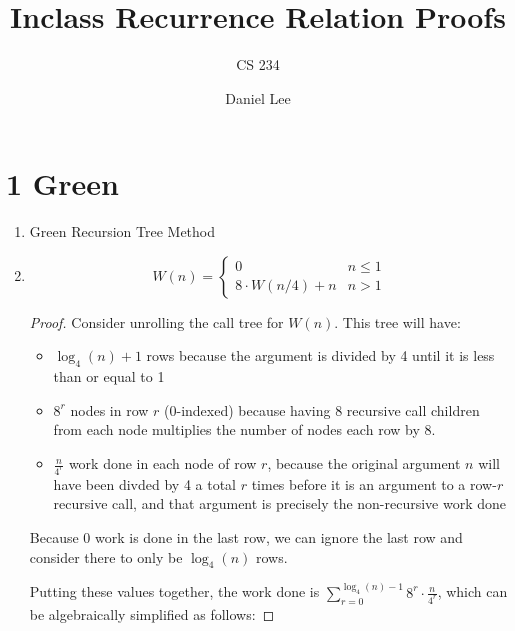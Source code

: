 \documentclass[10pt]{article}
\title{Inclass Recurrence Relation Proofs}
\author{CS 234}
\date{Daniel Lee}
\begin{document}
\maketitle

\section*{1 \quad Green}

\begin{enumerate}[label={}]
      \item Green Recursion Tree Method
      \item $$
                  W(n)= \begin{cases}0 & n \leq 1 \\ 8 \cdot W(n / 4)+n & n>1\end{cases}
            $$

            \begin{proof}
                  Consider unrolling the call tree for $W(n)$. This tree will have:
                  \begin{itemize}
                        \item $\log _4(n)+1$ rows because the argument is divided by 4 until it is less than or equal to 1
                        \item $8^r$ nodes in row $r$ (0-indexed) because having 8 recursive call children from each node multiplies the number of nodes each row by 8.
                        \item $\frac{n}{4^r}$ work done in each node of row $r$, because the original argument $n$ will have been divded by 4 a total $r$ times before it is an argument to a row-$r$ recursive call, and that argument is precisely the non-recursive work done
                  \end{itemize}
                  Because 0 work is done in the last row, we can ignore the last row and consider there to only be $\log _4(n)$ rows.

                  Putting these values together, the work done is $\sum_{r=0}^{\log _4(n)-1} 8^r \cdot \frac{n}{4^r}$, which can be algebraically simplified as follows:


\end{proof}
\end{enumerate}
\end{document}
